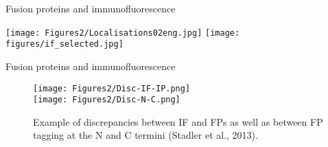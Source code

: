 
\begin{frame}{Fusion proteins and immunofluorescence}
  \begin{center}
    \texttt{[image: Figures2/Localisations02eng.jpg]}        
    \texttt{[image: figures/if\_selected.jpg]}    
  \end{center}
\end{frame}

\begin{frame}{Fusion proteins and immunofluorescence}
  \begin{figure}
    \centering
    \texttt{[image: Figures2/Disc-IF-IP.png]} \\
    \texttt{[image: Figures2/Disc-N-C.png]}
    \caption{Example of discrepancies between IF and FPs as well as
      between FP tagging at the N and C termini (Stadler et al., 2013).}
  \end{figure}
\end{frame}

